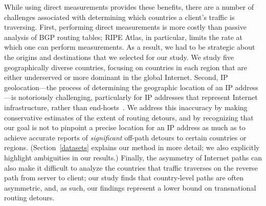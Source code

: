 While using direct measurements provides these benefits, there are a number of 
challenges associated with determining which countries a
client's traffic is traversing.  First,
performing direct measurements is more costly than passive analysis of BGP
routing tables; RIPE Atlas, in particular, limits the rate at which one can
perform measurements.  As a result, we had to be strategic about the origins
and destinations that we selected for our study. We study five
geographically diverse countries,  focusing on countries in each region that
are either underserved or more dominant in the global Internet.  Second, IP
geolocation---the process of determining the geographic location of an IP
address---is notoriously challenging, particularly for IP addresses that
represent Internet infrastructure, rather than end-hosts~\cite{gharaibeh2017look}. We address this
inaccuracy by making conservative estimates of the extent of routing detours,
and by recognizing that our goal is not to pinpoint a precise location for an
IP address as much as to achieve accurate reports of {\em significant} off-path 
detours to certain countries or regions. (Section~\ref{datasets} explains
our method in more detail; we also explicitly highlight ambiguities in our
results.) Finally, the asymmetry of Internet paths can also make it difficult
to analyze the countries that traffic traverses on the reverse path from
server to client; our study finds that country-level paths are often
asymmetric, and, as such, our findings represent a lower bound on
transnational routing detours.

